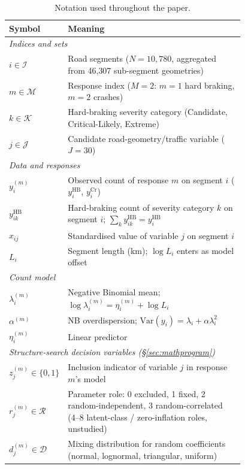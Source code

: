\documentclass[letterpaper,8pt]{extarticle}  %
\begin{document}
\begin{doublespacing}
\begin{linenumbers}
\begin{table}[!ht]
  \footnotesize
  \caption{Notation used throughout the paper.}\label{tab:notation}
  \begin{center}
    \begin{tabular}{lp{0.78\linewidth}}
      \toprule
      Symbol & Meaning \\
      \midrule
      \multicolumn{2}{l}{\emph{Indices and sets}} \\
      $i \in \mathcal{I}$ & Road segments ($N = 10{,}780$, aggregated from 46{,}307 sub-segment geometries) \\
      $m \in \mathcal{M}$ & Response index ($M = 2$: $m{=}1$ hard braking, $m{=}2$ crashes) \\
      $k \in \mathcal{K}$ & Hard-braking severity category (Candidate, Critical-Likely, Extreme) \\
      $j \in \mathcal{J}$ & Candidate road-geometry/traffic variable ($J = 30$) \\
      \multicolumn{2}{l}{\emph{Data and responses}} \\
      $y_i^{(m)}$ & Observed count of response $m$ on segment $i$ ($y_i^{\text{HB}}$, $y_i^{\text{Cr}}$) \\
      $y_{ik}^{\text{HB}}$ & Hard-braking count of severity category $k$ on segment $i$; $\sum_k y_{ik}^{\text{HB}} = y_i^{\text{HB}}$ \\
      $x_{ij}$ & Standardised value of variable $j$ on segment $i$ \\
      $L_i$ & Segment length (km); $\log L_i$ enters as model offset \\
      \multicolumn{2}{l}{\emph{Count model}} \\
      $\lambda_i^{(m)}$ & Negative Binomial mean; $\log \lambda_i^{(m)} = \eta_i^{(m)} + \log L_i$ \\
      $\alpha^{(m)}$ & NB overdispersion; $\mathrm{Var}(y_i) = \lambda_i + \alpha \lambda_i^2$ \\
      $\eta_i^{(m)}$ & Linear predictor \\
      \multicolumn{2}{l}{\emph{Structure-search decision variables (\S\ref{sec:mathprogram})}} \\
      $z_j^{(m)} \in \{0,1\}$ & Inclusion indicator of variable $j$ in response $m$'s model \\
      $r_j^{(m)} \in \mathcal{R}$ & Parameter role: 0 excluded, 1 fixed, 2 random-independent, 3 random-correlated (4--8 latent-class / zero-inflation roles, unstudied) \\
      $d_j^{(m)} \in \mathcal{D}$ & Mixing distribution for random coefficients (normal, lognormal, triangular, uniform) \\

\end{tabular}
\end{center}
\end{table}
\end{linenumbers}
\end{doublespacing}
\end{document}
